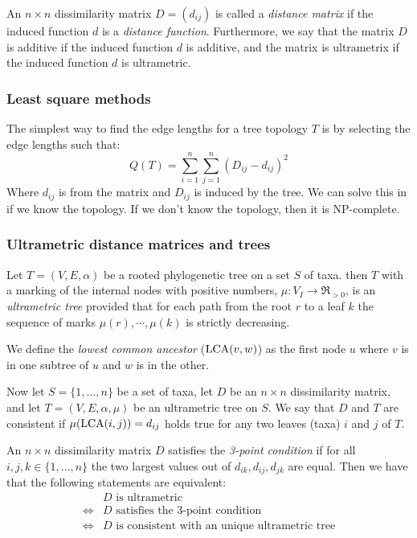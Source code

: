     An $n \times n$ dissimilarity matrix $D=(d_{ij})$ is called a 
    \textit{distance matrix} if the induced function $d$ is a \textit{distance 
    function}. Furthermore, we say that the matrix $D$ is additive if the 
    induced function $d$ is additive, and the matrix is ultrametrix if the 
    induced function $d$ is ultrametric.
    
    \subsubsection{Least square methods}
    The simplest way to find the edge lengths for a tree topology $T$ is by 
    selecting the edge lengths such that:
    \begin{equation*}
        Q(T)=\sum_{i=1}^{n}\sum_{j=1}^{n}(D_{ij}-d_{ij})^2
    \end{equation*}
    Where $d_{ij}$ is from the matrix and $D_{ij}$ is induced by the tree. We 
    can solve this in  if we know the topology. If we don't know the 
    topology, then it is NP-complete.
    
    \subsubsection{Ultrametric distance matrices and trees}
    Let $T=(V,E,\alpha)$ be a rooted phylogenetic tree on a set $S$ of taxa. 
    then $T$ with a marking of the internal nodes with positive numbers, 
    $\mu:V_I \rightarrow \Re_{>0}$, is an \textit{ultrametric tree} provided 
    that for each path from the root $r$ to a leaf $k$ the sequence of marks 
    $\mu(r), \cdots , \mu(k)$ is strictly decreasing.
    
    We define the \textit{lowest common ancestor} ($\text{LCA}(v,w)$) as the first 
    node $u$ where $v$ is in one subtree of $u$ and $w$ is in the other.
    
    Now let $S=\{1,\dots,n\}$ be a set of taxa, let $D$ be an $n \times n$ 
    dissimilarity matrix, and let $T=(V,E,\alpha,\mu)$ be an ultrametric tree 
    on $S$. We say that $D$ and $T$ are consistent if $\mu(\text{LCA}(i,j))=d_{ij}$ 
    holds true for any two leaves (taxa) $i$ and $j$ of $T$.
    
    An $n \times n$ dissimilarity matrix $D$ satisfies the \textit{3-point 
    condition} if for all $i,j,k\in \{1,\dots,n\}$ the two largest values out 
    of $d_{ik},d_{ij},d_{jk}$ are equal. Then we have that the following 
    statements are equivalent:
    \begin{align*}
        &D \text{ is ultrametric} \\
        \iff &D \text{ satisfies the 3-point condition} \\
        \iff &D \text{ is consistent with an unique ultrametric tree}
    \end{align*}
    
